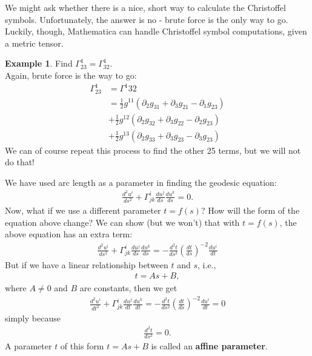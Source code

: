 \documentclass{article}
\theoremstyle{definition}
\newtheorem{exmp}{Example}[section]
\begin{document}
We might ask whether there is a nice, short way to calculate the Christoffel symbols. Unfortunately, the answer is no - brute force is the only way to go. Luckily, though, Mathematica can handle Christoffel symbol computations, given a metric tensor. 
\begin{exmp}
	Find $\Gamma^{1}_{23} = \Gamma^1_{32}$.\\
	
	Again, brute force is the way to go:
	\begin{align*}
	\Gamma^{1}_{23} &= \Gamma^1{32}\\
	&= \frac{1}{2}g^{11}\left( \partial_2 g_{31} + \partial_3 g_{21} - \partial_1 g_{23}\right)\\
	&+ \frac{1}{2}g^{12}\left( \partial_2 g_{32} + \partial_3 g_{22} - \partial_2 g_{23}\right)\\
	&+
	\frac{1}{2}g^{13}\left( \partial_2 g_{33} + \partial_3 g_{23} - \partial_3 g_{23}\right)
	\end{align*}
	We can of course repeat this process to find the other 25 terms, but we will not do that!
\end{exmp}

We have used arc length as a parameter in finding the geodesic equation:
\begin{align*}
\frac{d^2u^i}{ds^2} + \Gamma^{i}_{jk}\frac{du^j}{ds}\frac{du^k}{ds} = 0.
\end{align*}
Now, what if we use a different parameter $t = f(s)$? How will the form of the equation above change? We can show (but we won't) that with $t = f(s)$, the above equation has an extra term:
\begin{align*}
\boxed{\frac{d^2u^i}{ds^2} + \Gamma^{i}_{jk}\frac{du^j}{ds}\frac{du^k}{ds} = -\frac{d^2t}{ds^2}\left( \frac{dt}{ds}\right)^{-2}\frac{du^i}{dt}}
\end{align*}
But if we have a linear relationship between $t$ and $s$, i.e.,
\begin{align*}
t = As +B,
\end{align*}
where $A\neq 0$ and $B$ are constants, then we get
\begin{align*}
\boxed{\frac{d^2u^i}{dt^2} + \Gamma^{i}_{jk}\frac{du^j}{dt}\frac{du^k}{dt} = -\frac{d^2t}{ds^2}\left( \frac{dt}{ds}\right)^{-2}\frac{du^i}{dt} = 0}
\end{align*}
simply because
\begin{align*}
\frac{d^2t}{ds^2} = 0.
\end{align*}
A parameter $t$ of this form $t = As + B$ is called an \textbf{affine parameter}. 
\end{document}
